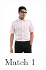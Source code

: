 \begin{figure}[H]
\begin{subfigure}[b]{0.19\textwidth}
      \includegraphics[width=\textwidth]{images/2output2.jpeg}
      \caption{Match 1}
  \end{subfigure}
  \begin{subfigure}[b]{0.19\textwidth}

\end{subfigure}
\end{figure}
